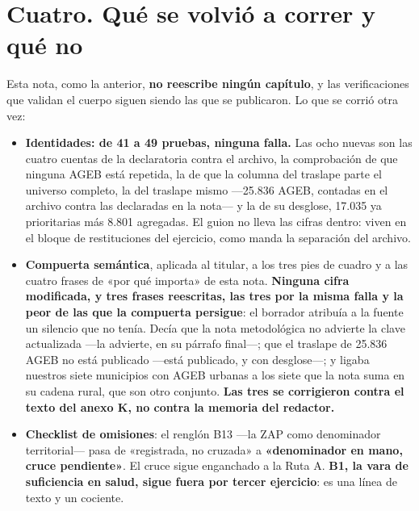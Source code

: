 
\section*{Cuatro. Qué se volvió a correr y qué no}

Esta nota, como la anterior, \textbf{no reescribe ningún capítulo}, y las verificaciones que
validan el cuerpo siguen siendo las que se publicaron. Lo que se corrió otra vez:

\begin{itemize}
\item \textbf{Identidades: de 41 a 49 pruebas, ninguna falla.} Las ocho nuevas son las cuatro
cuentas de la declaratoria contra el archivo, la comprobación de que ninguna AGEB está
repetida, la de que la columna del traslape parte el universo completo, la del traslape
mismo ---25.836 AGEB, contadas en el archivo contra las declaradas en la nota--- y la de su
desglose, 17.035 ya prioritarias más 8.801 agregadas. El guion no lleva las cifras dentro:
viven en el bloque de restituciones del ejercicio, como manda la separación del archivo.
\item \textbf{Compuerta semántica}, aplicada al titular, a los tres pies de cuadro y a las
cuatro frases de «por qué importa» de esta nota. \textbf{Ninguna cifra modificada, y tres
frases reescritas, las tres por la misma falla y la peor de las que la compuerta persigue}:
el borrador atribuía a la fuente un silencio que no tenía. Decía que la nota metodológica no
advierte la clave actualizada ---la advierte, en su párrafo final---; que el traslape de
25.836 AGEB no está publicado ---está publicado, y con desglose---; y ligaba nuestros siete
municipios con AGEB urbanas a los siete que la nota suma en su cadena rural, que son otro
conjunto. \textbf{Las tres se corrigieron contra el texto del anexo K, no contra la memoria
del redactor.}
\item \textbf{Checklist de omisiones}: el renglón B13 ---la ZAP como denominador
territorial--- pasa de «registrada, no cruzada» a \textbf{«denominador en mano, cruce
pendiente»}. El cruce sigue enganchado a la Ruta A. \textbf{B1, la vara de suficiencia en
salud, sigue fuera por tercer ejercicio}: es una línea de texto y un cociente.
\end{itemize}

